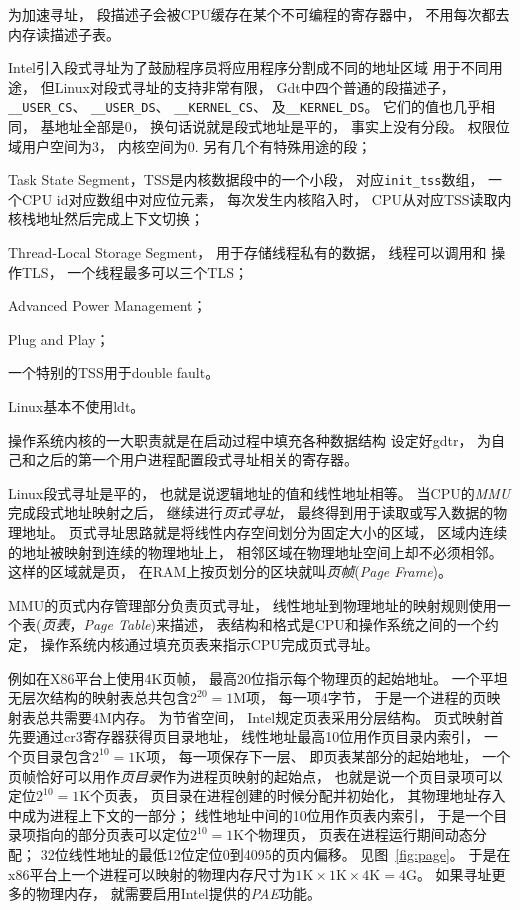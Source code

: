 为加速寻址，
段描述子会被CPU缓存在某个不可编程的寄存器中，
不用每次都去内存读描述子表。

Intel引入段式寻址为了鼓励程序员将应用程序分割成不同的地址区域%
用于不同用途，
但Linux对段式寻址的支持非常有限，
Gdt中四个普通的段描述子，
\verb|__USER_CS|、
\verb|__USER_DS|、
\verb|__KERNEL_CS|、
及\verb|__KERNEL_DS|。
它们的值也几乎相同，
基地址全部是0，
换句话说就是段式地址是平的，
事实上没有分段。
权限位域用户空间为3，
内核空间为0.
另有几个有特殊用途的段；
\begin{enumerate*}[label=\itshape\alph*\upshape)]
\item Task State Segment，TSS是内核数据段中的一个小段，
  对应\verb|init_tss|数组，
  一个CPU id对应数组中对应位元素，
  每次发生内核陷入时，
  CPU从对应TSS读取内核栈地址然后完成上下文切换；
\item Thread-Local Storage Segment，
  用于存储线程私有的数据，
  线程可以调用和
  操作TLS，
  一个线程最多可以三个TLS；
\item Advanced Power Management；
\item Plug and Play；
\item 一个特别的TSS用于double fault。
\end{enumerate*}
Linux基本不使用ldt。

操作系统内核的一大职责就是在启动过程中填充各种数据结构
设定好gdtr，
为自己和之后的第一个用户进程配置段式寻址相关的寄存器。

Linux段式寻址是平的，
也就是说逻辑地址的值和线性地址相等。
当CPU的\emph{MMU}完成段式地址映射之后，
继续进行\emph{页式寻址}，
最终得到用于读取或写入数据的物理地址。
页式寻址思路就是将线性内存空间划分为固定大小的区域，
区域内连续的地址被映射到连续的物理地址上，
相邻区域在物理地址空间上却不必须相邻。
这样的区域就是页，
在RAM上按页划分的区块就叫\emph{页帧}(\emph{Page Frame})。

MMU的页式内存管理部分负责页式寻址，
线性地址到物理地址的映射规则使用一个表(\emph{页表}，\emph{Page Table})来描述，
表结构和格式是CPU和操作系统之间的一个约定，
操作系统内核通过填充页表来指示CPU完成页式寻址。

例如在X86平台上使用4K页帧，
最高20位指示每个物理页的起始地址。
一个平坦无层次结构的映射表总共包含$2^{20} = 1\text{M}$项，
每一项4字节，
于是一个进程的页映射表总共需要4M内存。
为节省空间，
Intel规定页表采用分层结构。
页式映射首先要通过cr3寄存器获得页目录地址，
线性地址最高10位用作页目录内索引，
一个页目录包含$2^{10} = 1\text{K}$项，
每一项保存下一层、
即页表某部分的起始地址，
一个页帧恰好可以用作\emph{页目录}作为进程页映射的起始点，
也就是说一个页目录项可以定位$2^{10} = 1\text{K}$个页表，
页目录在进程创建的时候分配并初始化，
其物理地址存入中成为进程上下文的一部分；
线性地址中间的10位用作页表内索引，
于是一个目录项指向的部分页表可以定位$2^{10}=1\text{K}$个物理页，
页表在进程运行期间动态分配；
32位线性地址的最低12位定位0到4095的页内偏移。
见图~\ref{fig:page}。
于是在x86平台上一个进程可以映射的物理内存尺寸为$1\text{K}\times 1\text{K} \times 4\text{K}=4\text{G}$。
如果寻址更多的物理内存，
就需要启用Intel提供的\emph{PAE}功能。

